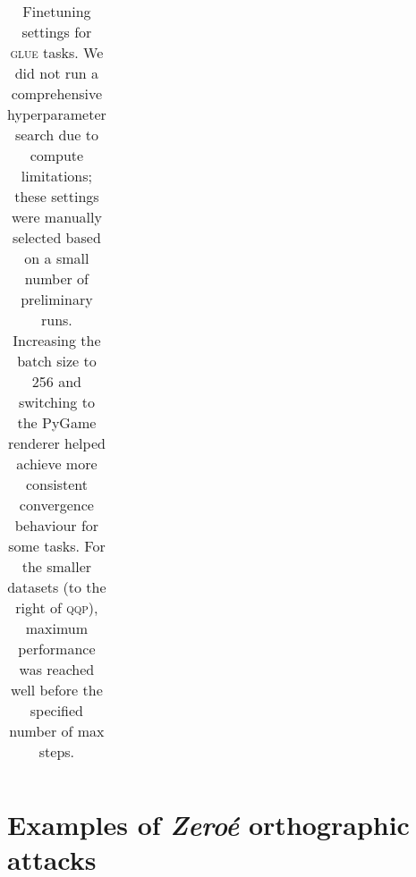 \documentclass{article}
\begin{document}
\begin{table}[ht]
{\begin{tabular}{@{}lccccccccc@{}}
\end{tabular}}
\caption{Finetuning settings for \textsc{glue} tasks. We did not run a comprehensive hyperparameter search due to compute limitations; these settings were manually selected based on a small number of preliminary runs. Increasing the batch size to 256 and switching to the PyGame renderer helped achieve more consistent convergence behaviour for some tasks. For the smaller datasets (to the right of \textsc{qqp}), maximum performance was reached well before the specified number of max steps.}
\label{tab:finetuning_details2}
\end{table}

\clearpage

\section{Examples of \textit{Zeroé} orthographic attacks}
\label{app:zeroe}
\begin{table}[h]
\vspace{-1em}
\centering
{}
\caption{Examples of low-level orthographic attacks based on the \textit{Zeroé} benchmark.}
\label{tab:zeroe-examples} 
\end{table}
\end{document}
